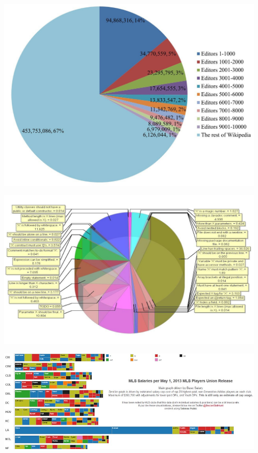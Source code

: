 \documentclass[
]{book}
\begin{document}
\includegraphics{img/vis3.jpg}

\includegraphics{img/vis6.jpg}

\includegraphics{img/vis7.jpeg}
\end{document}

